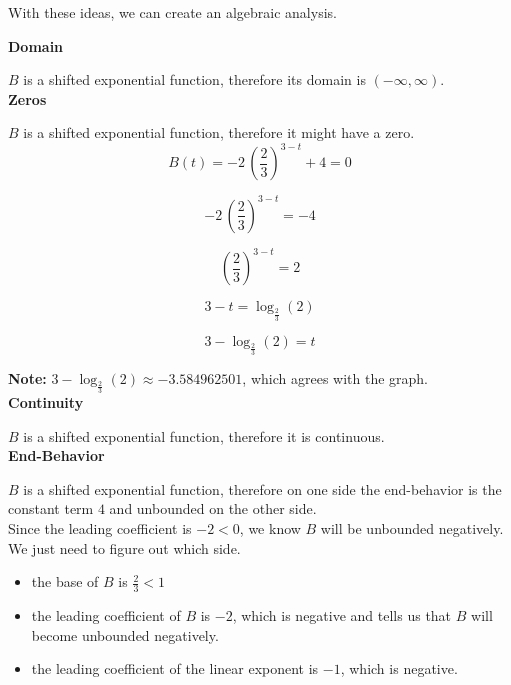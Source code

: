 \documentclass{ximera}
\begin{document}
\begin{example}
\begin{idea}
With these ideas, we can create an algebraic analysis. \\



\end{idea}










\textbf{Domain}

$B$ is a shifted exponential function, therefore its domain is $(-\infty, \infty)$. \\




\textbf{Zeros}

$B$ is a shifted exponential function, therefore it might have a zero. \\




\[ B(t) = -2 \, \left( \frac{2}{3} \right)^{3-t} + 4 = 0 \]


\[ -2 \, \left( \frac{2}{3} \right)^{3-t} = -4 \]

\[ \left( \frac{2}{3} \right)^{3-t} = 2 \]

\[ 3 - t = \log_{\tfrac{2}{3}}(2) \]

\[ 3 - \log_{\tfrac{2}{3}}(2) = t \]


\textbf{Note:} $3 - \log_{\tfrac{2}{3}}(2) \approx -3.584962501$, which agrees with the graph. \\







\textbf{Continuity}

$B$ is a shifted exponential function, therefore it is continuous. \\






\textbf{End-Behavior}

$B$ is a shifted exponential function, therefore on one side the end-behavior is the constant term $4$ and unbounded on the other side. \\


Since the leading coefficient is $-2 < 0$, we know $B$ will be unbounded negatively.  We just need to figure out which side. \\


\begin{itemize}
  \item the base of $B$ is $\frac{2}{3} < 1$
  \item the leading coefficient of $B$ is $-2$, which is negative and tells us that $B$ will become unbounded negatively.
  \item the leading coefficient of the linear exponent is $-1$, which is negative.
\end{itemize}



\end{example}
\end{document}
